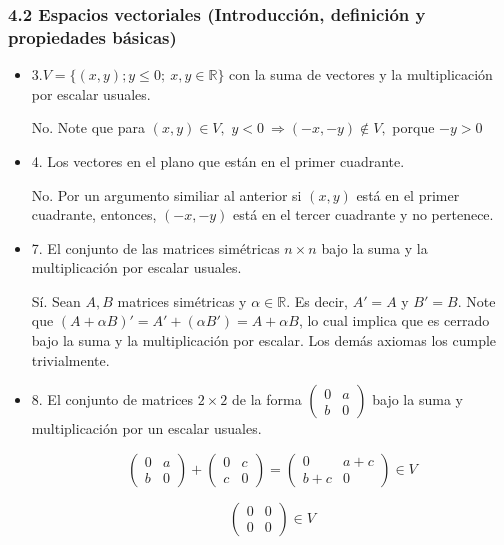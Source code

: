 \documentclass[12pt]{article}
\theoremstyle{plain}
\theoremstyle{definition}
\begin{document}
\subsubsection{4.2 Espacios vectoriales (Introducción, definición y propiedades básicas)}
\begin{itemize}
    \item 3.$V=\{(x,y); y\leq0;\ x,y\in \mathbb{R}\}$ con la suma de vectores y la multiplicación por escalar usuales.
    
    No. Note que para $(x,y)\in V,$  $y<0\ \Rightarrow (-x,-y)\notin V,$ porque $-y>0$
    
    \item 4. Los vectores en el plano que están en el primer cuadrante.
    
    No. Por un argumento similiar al anterior si $(x,y)$ está en el primer cuadrante, entonces, $(-x,-y)$ está en el tercer cuadrante y no pertenece.
    
    \item 7. El conjunto de las matrices simétricas $n\times n$ bajo la suma y la multiplicación por escalar usuales.
    
    Sí. Sean $A,B$ matrices simétricas y $\alpha \in \mathbb{R}$. Es decir, $A\prime=A$ y $B\prime=B$. Note que $(A+\alpha B)\prime=A\prime+(\alpha B\prime)=A+\alpha B$, lo cual implica que es cerrado bajo la suma y la multiplicación por escalar. Los demás axiomas los cumple trivialmente. 
    
    \item 8. El conjunto de matrices $2\times2$ de la forma $\begin{pmatrix}0&a\\b&0\end{pmatrix}$ bajo la suma y multiplicación por un escalar usuales.
    
    $$\begin{pmatrix}0&a\\b&0\end{pmatrix}+\begin{pmatrix}0&c\\c&0\end{pmatrix}=\begin{pmatrix}0&a+c\\b+c&0\end{pmatrix}\in V$$
    
    $$\begin{pmatrix}0&0\\0&0\end{pmatrix}\in V$$  
    

\end{itemize}
\end{document}

